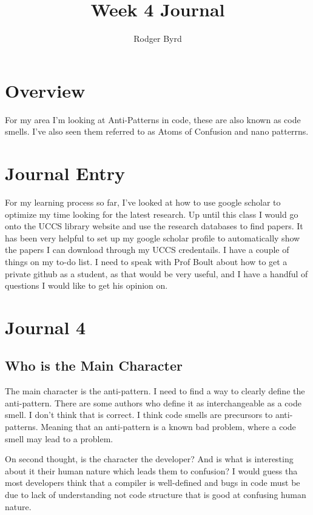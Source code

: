\documentclass[conference]{IEEEtran}
\begin{document}

\title{Week 4 Journal}
\author{Rodger Byrd}
\maketitle


\section{Overview}
For my area I'm looking at Anti-Patterns in code, these are also known as code smells. I've also seen them referred to as Atoms of Confusion and nano patterrns.

\section{Journal Entry}
For my learning process so far, I've looked at how to use google scholar to optimize my time looking for the latest research.
Up until this class I would go onto the UCCS library website and use the research databases to find papers. 
It has been very helpful to set up my google scholar profile to automatically show the papers I can download through my UCCS credentails.
I have a couple of things on my to-do list.
I need to speak with Prof Boult about how to get a private github as a student, as that would be very useful, and I have a handful of questions I would like to get his opinion on. 

\section{Journal 4}
\subsection{Who is the Main Character}
The main character is the anti-pattern. I need to find a way to clearly define the anti-pattern. 
There are some authors who define it as interchangeable as a code smell. 
I don't think that is correct. 
I think code smells are precursors to anti-patterns. 
Meaning that an anti-pattern is a known bad problem, where a code smell may lead to a problem. 

On second thought, is the character the developer? 
And is what is interesting about it their human nature which leads them to confusion?
I would guess tha most developers think that a compiler is well-defined and bugs in code must be due to lack of understanding not code structure that is good at confusing human nature.
\end{document}
